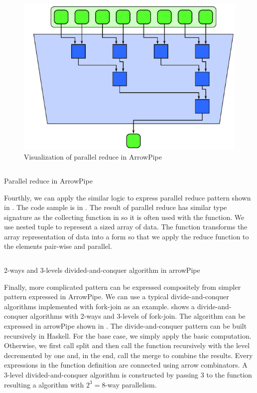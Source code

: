 \begin{figure}[ht]
    \centering 
    \includegraphics{arrow/preduc.png}
    \caption{Visualization of parallel reduce in ArrowPipe \cite{mccoolStructuredParallelPrograming2012}}
    \label{arrow:fig:preduc}
\end{figure}
\begin{listing}[ht]
    \inputminted{Haskell}{arrow/preduc.hs} 
    \caption{Parallel reduce in ArrowPipe}
    \label{arrow:code:preduc}
\end{listing}
Fourthly, we can apply the similar logic to express parallel reduce pattern shown in . The code sample is in . The result of parallel reduce has similar type signature as the collecting function in  so it is often used with the  function. We use nested tuple  to represent a sized array of data. The  function transforms the array representation of data into a form so that we apply the reduce function  to the elements pair-wise and parallel.

\begin{listing}[ht]
    \inputminted{Haskell}{arrow/dq.hs}
    \caption{2-ways and 3-levels divided-and-conquer algorithm in arrowPipe}
    \label{arrowPipe:dq}
\end{listing}
Finally, more complicated pattern can be expressed compositely from simpler pattern expressed in ArrowPipe. We can use a typical divide-and-conquer algorithms implemented with fork-join as an example.  shows a divide-and-conquer algorithms with 2-ways and 3-levels of fork-join. The algorithm can be expressed in arrowPipe shown in . The divide-and-conquer pattern can be built recursively in Haskell. For the base case, we simply apply the basic computation. Otherwise, we first call split and then call the function recursively with the level decremented by one and, in the end, call the merge to combine the results. Every expressions in the function definition are connected using arrow combinators. A 3-level divided-and-conquer algorithm is constructed by passing 3 to the function resulting a algorithm with $2^3 = 8$-way parallelism.

